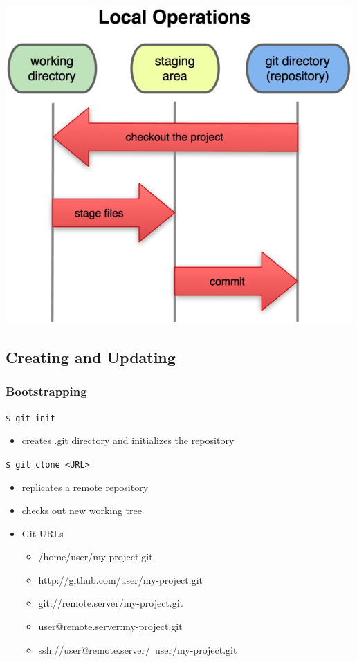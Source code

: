 \documentclass[english,compress]{beamer}
\begin{document}
{
    \begin{center}
        \includegraphics[width=.8\textwidth]{figs/sections.png}
    \end{center}
}

\subsection{Creating and Updating}
\begin{frame}[fragile]
    \frametitle{Bootstrapping}
    
    \verb|$ git init|
    \begin{itemize}
        \item creates .git directory and initializes the repository
    \end{itemize}
    \verb|$ git clone <URL>|
    \begin{itemize}
        \item replicates a remote repository
        \item checks out new working tree
        \item Git URLs
            \begin{itemize}
                \item /home/user/my-project.git
                \item http://github.com/user/my-project.git
                \item git://remote.server/my-project.git
                \item user@remote.server:my-project.git
                \item ssh://user@remote.server/~user/my-project.git
            \end{itemize}
    \end{itemize}
\end{frame}
\end{document}
